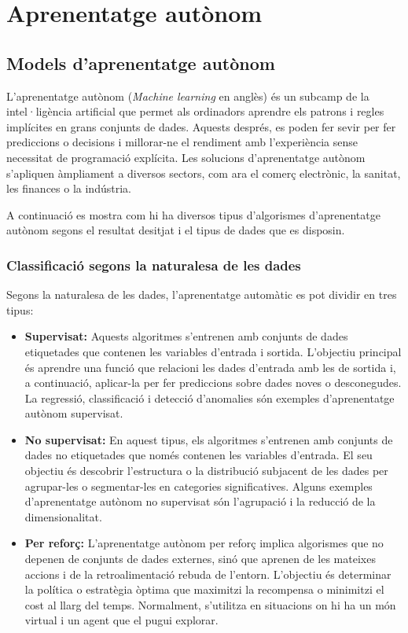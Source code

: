 \section{Aprenentatge autònom}

\subsection{Models d'aprenentatge autònom}
L'aprenentatge autònom (\textit{Machine learning} en anglès) és un subcamp de la intel·ligència artificial que permet als ordinadors aprendre els patrons i regles implícites en grans conjunts de dades. Aquests després, es poden fer sevir per fer prediccions o decisions i millorar-ne el rendiment amb l'experiència sense necessitat de programació explícita. Les solucions d'aprenentatge autònom s'apliquen àmpliament a diversos sectors, com ara el comerç electrònic, la sanitat, les finances o la indústria.

A continuació es mostra com hi ha diversos tipus d'algorismes d'aprenentatge autònom segons el resultat desitjat i el tipus de dades que es disposin.

\subsubsection{Classificació segons la naturalesa de les dades}
Segons la naturalesa de les dades, l'aprenentatge automàtic es pot dividir en tres tipus: 
\begin{itemize}
    \item \textbf{Supervisat:} Aquests algoritmes s'entrenen amb conjunts de dades etiquetades que contenen les variables d'entrada i sortida. L'objectiu principal és aprendre una funció que relacioni les dades d'entrada amb les de sortida i, a continuació, aplicar-la per fer prediccions sobre dades noves o desconegudes. La regressió, classificació i detecció d'anomalies són exemples d'aprenentatge autònom supervisat.
    \item \textbf{No supervisat:} En aquest tipus, els algoritmes s'entrenen amb conjunts de dades no etiquetades que només contenen les variables d'entrada. El seu objectiu és descobrir l'estructura o la distribució subjacent de les dades per agrupar-les o segmentar-les en categories significatives. Alguns exemples d'aprenentatge autònom no supervisat són l'agrupació i la reducció de la dimensionalitat.
    \item \textbf{Per reforç:} L'aprenentatge autònom per reforç implica algorismes que no depenen de conjunts de dades externes, sinó que aprenen de les mateixes accions i de la retroalimentació rebuda de l'entorn. L'objectiu és determinar la política o estratègia òptima que maximitzi la recompensa o minimitzi el cost al llarg del temps. Normalment, s'utilitza en situacions on hi ha un món virtual i un agent que el pugui explorar.
\end{itemize}

